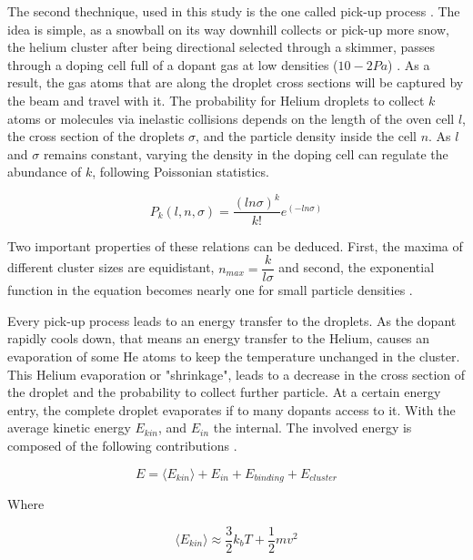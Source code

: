 The second thechnique, used in this study is the one called pick-up process \cite{gough_infrared_1985}. The idea is simple, as a snowball on its way downhill collects or pick-up more snow, the helium cluster after being directional selected through a skimmer, passes through a doping cell full of a dopant gas at low densities ($10-2 Pa$) \cite{stienkemeier_spectroscopy_2006}. As a result, the gas atoms that are along the droplet cross sections will be captured by the beam and travel with it. The probability for Helium droplets to collect $k$ atoms or molecules via inelastic collisions depends on the length of the oven cell $l$, the cross section of the droplets $\sigma $, and the particle density inside the cell $n$. As $l$ and $\sigma $ remains constant, varying the density in the doping cell can regulate the abundance of $k$, following Poissonian statistics.

\begin{equation}
P_{k}(l,n,\sigma)=\dfrac{(ln\sigma)^{k}}{k!} e^{(-ln\sigma)}
\end{equation}

Two important properties of these relations can be deduced. First, the maxima of different cluster sizes  are equidistant, $n_{max}=\dfrac{k}{l\sigma}$ and second, the exponential function in the equation  becomes  nearly  one for  small  particle  densities \cite{bunermann_modeling_2011}.

Every pick-up process leads to an energy transfer to the droplets. As the dopant rapidly cools down, that means an energy transfer to the Helium, causes an evaporation of some He atoms to keep the temperature unchanged in the cluster. This Helium evaporation or "shrinkage", leads to a decrease in the cross section of the droplet and the probability to collect further particle. At a certain energy entry, the complete droplet evaporates if to many dopants access to it. With the average kinetic energy $E_{kin}$, and $E_{in}$ the internal.  The involved energy is composed of the following contributions \cite{bunermann_modeling_2011}.

\begin{equation}
E=\langle E_{kin}\rangle + E_{in} + E_{binding} + E_{cluster}
\end{equation}

Where

\begin{equation}
\langle E_{kin}\rangle \approx \dfrac{3}{2}k_{b}T + \dfrac{1}{2} m v^{2}
\end{equation}

